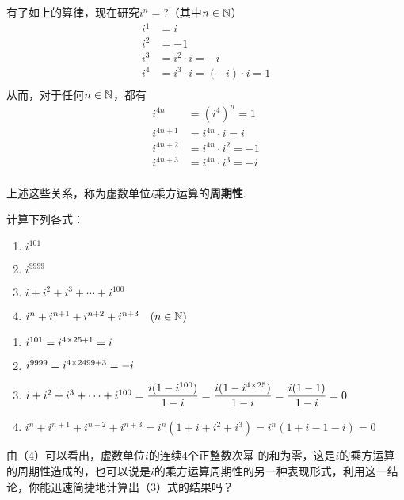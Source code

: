 有了如上的算律，现在研究$i^n=?$（其中$n\in\mathbb{N}$）
\[\begin{split}
    i^1&=i\\
    i^2&=-1\\
    i^3&=i^2\cdot i=-i\\
    i^4&=i^3\cdot i=(-i)\cdot i=1\\
\end{split}\]
从而，对于任何$n\in\mathbb{N}$，都有
\[\begin{split}
    i^{4n}&=(i^4)^n=1\\
    i^{4n+1}&=i^{4n}\cdot i=i\\
    i^{4n+2}&=i^{4n}\cdot i^2=-1\\
    i^{4n+3}&=i^{4n}\cdot i^3=-i\\
\end{split}\]

上述这些关系，称为虚数单位$i$乘方运算的\textbf{周期性}.


\begin{example}
    计算下列各式：
\begin{multicols}{2}
\begin{enumerate}[(1)]
    \item $i^{101}$ 
    \item $i^{9999}$ 
    \item $i+i^2+i^3+\cdots+i^{100}$ 
    \item $i^{n}+i^{n+1}+i^{n+2}+i^{n+3}\quad (n\in\mathbb{N})$ 
\end{enumerate}
\end{multicols}
\end{example}

\begin{solution}
\begin{enumerate}[(1)]
    \item $i^{101}=i^{4\times 25+1}=i$ 
    \item $i^{9999}=i^{4\times 2499+3}=-i$ 
    \item $i+i^2+i^3+\cdots+i^{100}=\dfrac{i(1-i^{100})}{1-i}=\dfrac{i(1-i^{4\times 25})}{1-i}=\dfrac{i(1-1)}{1-i}=0$ 
    \item $i^{n}+i^{n+1}+i^{n+2}+i^{n+3}=i^n(1+i+i^2+i^3)=i^n(1+i-1-i)=0$ 
\end{enumerate}
\end{solution}

由（4）可以看出，虚数单位$i$的连续4个正整数次幂
的和为零，这是$i$的乘方运算的周期性造成的，也可以说是$i$的乘方运算周期性的另一种表现形式，利用这一结论，你能迅速简捷地计算出（3）式的结果吗？

